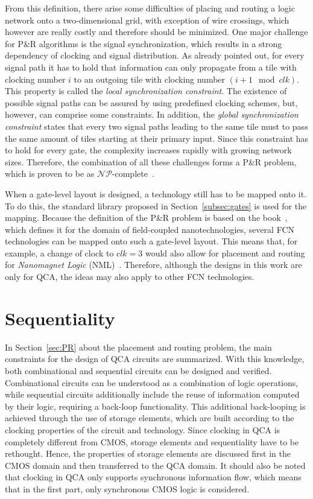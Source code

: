 From this definition, there arise some difficulties of placing and routing a logic network onto a two-dimensional grid, with exception of wire crossings, which however are really costly and therefore should be minimized. One major challenge for P\&R algorithms is the signal synchronization, which results in a strong dependency of clocking and signal distribution. As already pointed out, for every signal path it has to hold that information can only propagate from a tile with clocking number $i$ to an outgoing tile with clocking number $(i+1 \mod clk)$. This property is called the \textit{local synchronization constraint}. The existence of possible signal paths can be assured by using predefined clocking schemes, but, however, can comprise some constraints. In addition, the \textit{global synchronization constraint} states that every two signal paths leading to the same tile must to pass the same amount of tiles starting at their primary input. Since this constraint has to hold for every gate, the complexity increases rapidly with growing network sizes. Therefore, the combination of all these challenges forms a P\&R problem, which is proven to be as $\mathcal{NP}$-complete~\cite{NP-hard}.

When a gate-level layout is designed, a technology still has to be mapped onto it. To do this, the standard library proposed in Section~\ref{subsec:gates} is used for the mapping. Because the definition of the P\&R problem is based on the book~\cite{Walter}, which defines it for the domain of field-coupled nanotechnologies, several FCN technologies can be mapped onto such a gate-level layout. This means that, for example, a change of clock to $clk = 3$ would also allow for placement and routing for \textit{Nanomagnet Logic} (NML)~\cite{turvani2014physical}. Therefore, although the designs in this work are only for QCA, the ideas may also apply to other FCN technologies.

\section{Sequentiality}\label{subsec:latchesandregisters}

In Section~\ref{sec:PR} about the placement and routing problem, the main constraints for the design of QCA circuits are summarized. With this knowledge, both combinational and sequential circuits can be designed and verified. Combinational circuits can be understood as a combination of logic operations, while sequential circuits additionally include the reuse of information computed by their logic, requiring a back-loop functionality. This additional back-looping is achieved through the use of storage elements, which are built according to the clocking properties of the circuit and technology. Since clocking in QCA is completely different from CMOS, storage elements and sequentiality have to be rethought. Hence, the properties of storage elements are discussed first in the CMOS domain and then transferred to the QCA domain. It should also be noted that clocking in QCA only supports synchronous information flow, which means that in the first part, only synchronous CMOS logic is considered.

